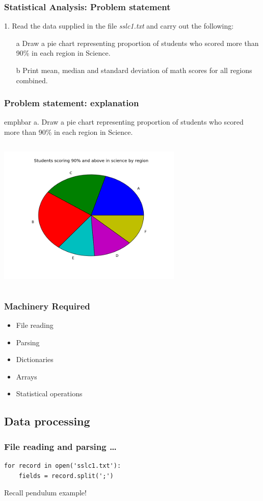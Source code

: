 \documentclass[14pt,compress]{beamer}
\newcommand{\emphbar}[1]
{\begin{beamercolorbox}[rounded=true]{emphbar} 
      {#1}
 \end{beamercolorbox}
}
\begin{document}
\begin{frame}
  \frametitle{Statistical Analysis: Problem statement}
  1. Read the data supplied in the file \emph{sslc1.txt} and carry out the following:
  \begin{itemize}
    \item[a] Draw a pie chart representing proportion of students who scored more than 90\% in each region in Science.
    \item[b] Print mean, median and standard deviation of math scores for all regions combined.
  \end{itemize}
\end{frame}

\begin{frame}
  \frametitle{Problem statement: explanation}
    \emphbar{a. Draw a pie chart representing proportion of students who scored more than 90\% in each region in Science.}
\begin{columns}
    \hspace*{.5in}
\includegraphics[height=2.6in, interpolate=true]{data/science}
\end{columns}
\end{frame}

\begin{frame}
  \frametitle{Machinery Required}
  \begin{itemize}
    \item File reading
    \item Parsing
    \item Dictionaries 
    \item Arrays
    \item Statistical operations
  \end{itemize}
\end{frame}

\subsection{Data processing}
\begin{frame}[fragile]
  \frametitle{File reading and parsing \ldots}
  \begin{lstlisting}
for record in open('sslc1.txt'):
    fields = record.split(';')
  \end{lstlisting}
\begin{block}{}
\centerline{Recall pendulum example!}
\end{block}
\end{frame}
\end{document}
